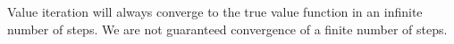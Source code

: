 \tffalse

Value iteration will always converge to the true value function in an infinite number of steps. We are not guaranteed convergence of a finite number of steps.